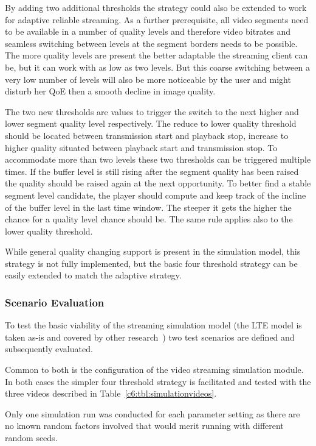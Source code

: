 By adding two additional thresholds the strategy could also be extended to work for adaptive reliable streaming. As a further prerequisite, all video segments need to be available in a number of quality levels and therefore video bitrates and seamless switching between levels at the segment borders needs to be possible. The more quality levels are present the better adaptable the streaming client can be, but it can work with as low as two levels. But this coarse switching between a very low number of levels will also be more noticeable by the user and might disturb her \gls{QoE} then a smooth decline in image quality.

The two new thresholds are values to trigger the switch to the next higher and lower segment quality level respectively. The reduce to lower quality threshold should be located between transmission start and playback stop, increase to higher quality situated between playback start and transmission stop. To accommodate more than two levels these two thresholds can be triggered multiple times. If the buffer level is still rising after the segment quality has been raised the quality should be raised again at the next opportunity. To better find a stable segment level candidate, the player should compute and keep track of the incline of the buffer level in the last time window. The steeper it gets the higher the chance for a quality level chance should be. The same rule applies also to the lower quality threshold.

While general quality changing support is present in the simulation model, this strategy is not fully implemented, but the basic four threshold strategy can be easily extended to match the adaptive strategy.


\subsubsection{Scenario Evaluation}

To test the basic viability of the streaming simulation model (the \gls{LTE} model is taken as-is and covered by other research~\cite{Baldo:2013:OSM:2507924.2507940}) two test scenarios are defined and subsequently evaluated.

Common to both is the configuration of the video streaming simulation module. In both cases the simpler four threshold strategy is facilitated and tested with the three videos described in Table~\ref{c6:tbl:simulationvideos}.

Only one simulation run was conducted for each parameter setting as there are no known random factors involved that would merit running with different random seeds.


